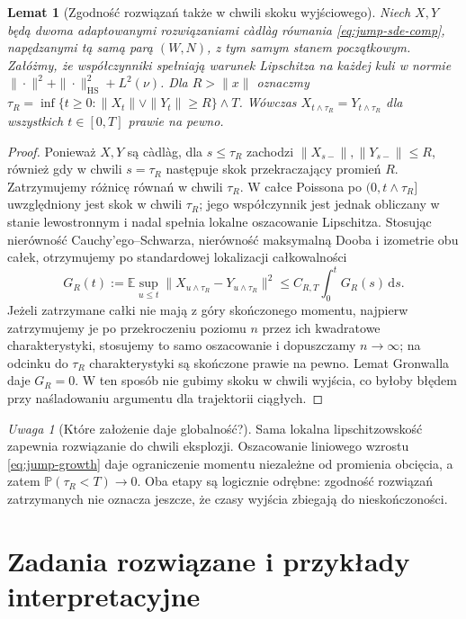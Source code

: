 \documentclass[11pt,a4paper,oneside]{report}
\numberwithin{equation}{chapter}
\theoremstyle{plain}
\newtheorem{lemat}[twierdzenie]{Lemat}
\theoremstyle{definition}
\theoremstyle{remark}
\newtheorem{uwaga}{Uwaga}[chapter]
\newcommand{\Prob}{\mathbb{P}}
\newcommand{\E}{\mathbb{E}}
\newcommand{\dd}{\mathrm{d}}
\begin{document}
\begin{lemat}[Zgodność rozwiązań także w chwili skoku wyjściowego]\label{lem:volIII:13:02}
\label{lem:jump-exit-audit}
Niech $X,Y$ będą dwoma adaptowanymi rozwiązaniami càdlàg
równania \eqref{eq:jump-sde-comp}, napędzanymi tą samą parą
$(W,N)$, z tym samym stanem początkowym. Załóżmy, że
współczynniki spełniają warunek Lipschitza na każdej kuli
w normie $\|\cdot\|^2+\|\cdot\|_{\mathrm{HS}}^2+L^2(\nu)$.
Dla $R>\|x\|$ oznaczmy
$\tau_R=\inf\{t\ge0:\|X_t\|\vee\|Y_t\|\ge R\}\wedge T$.
Wówczas $X_{t\wedge\tau_R}=Y_{t\wedge\tau_R}$ dla
wszystkich $t\in[0,T]$ prawie na pewno.
\end{lemat}
\begin{proof}
Ponieważ $X,Y$ są càdlàg, dla $s\le\tau_R$ zachodzi
$\|X_{s-}\|,\|Y_{s-}\|\le R$, również gdy w chwili
$s=\tau_R$ następuje skok przekraczający promień $R$.
Zatrzymujemy różnicę równań w chwili $\tau_R$. W całce
Poissona po $(0,t\wedge\tau_R]$ uwzględniony jest skok
w chwili $\tau_R$; jego współczynnik jest jednak obliczany
w stanie lewostronnym i nadal spełnia lokalne oszacowanie
Lipschitza. Stosując nierówność Cauchy'ego--Schwarza,
nierówność maksymalną Dooba i izometrie obu całek,
otrzymujemy po standardowej lokalizacji całkowalności
\[
 G_R(t):=\E\sup_{u\le t}
 \|X_{u\wedge\tau_R}-Y_{u\wedge\tau_R}\|^2
 \le C_{R,T}\int_0^t G_R(s)\,\dd s.
\]
Jeżeli zatrzymane całki nie mają z góry skończonego
momentu, najpierw zatrzymujemy je po przekroczeniu poziomu
$n$ przez ich kwadratowe charakterystyki, stosujemy to samo
oszacowanie i dopuszczamy $n\to\infty$; na odcinku do
$\tau_R$ charakterystyki są skończone prawie na pewno.
Lemat Gronwalla daje $G_R=0$. W ten sposób nie gubimy
skoku w chwili wyjścia, co byłoby błędem przy
naśladowaniu argumentu dla trajektorii ciągłych.
\end{proof}

\begin{uwaga}[Które założenie daje globalność?]
Sama lokalna lipschitzowskość zapewnia rozwiązanie do chwili
eksplozji. Oszacowanie liniowego wzrostu
\eqref{eq:jump-growth} daje ograniczenie momentu niezależne
od promienia obcięcia, a zatem $\Prob(\tau_R<T)\to0$.
Oba etapy są logicznie odrębne: zgodność rozwiązań
zatrzymanych nie oznacza jeszcze, że czasy wyjścia
zbiegają do nieskończoności.
\end{uwaga}

\section{Zadania rozwiązane i przykłady interpretacyjne}\label{sec:volIII:13:06}
\end{document}
